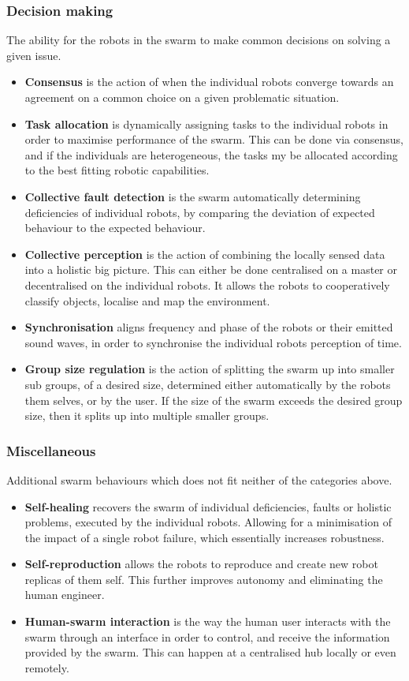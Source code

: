 \subsubsection{Decision making}
The ability for the robots in the swarm to make common decisions on solving a given issue.
\begin{itemize}
    \item \textbf{Consensus} is the action of when the individual robots converge towards an agreement on a common choice on a given problematic situation.
    \item \textbf{Task allocation} is dynamically assigning tasks to the individual robots in order to maximise performance of the swarm. This can be done via consensus, and if the individuals are heterogeneous, the tasks my be allocated according to the best fitting robotic capabilities. 
    \item \textbf{Collective fault detection} is the swarm automatically determining deficiencies of individual robots, by comparing the deviation of expected behaviour to the expected behaviour. 
    \item \textbf{Collective perception} is the action of combining the locally sensed data into a holistic big picture. This can either be done centralised on a master or decentralised on the individual robots. It allows the robots to cooperatively classify objects, localise and map the environment. 
    \item \textbf{Synchronisation} aligns frequency and phase of the robots or their emitted sound waves, in order to synchronise the individual robots perception of time. 
    \item \textbf{Group size regulation} is the action of splitting the swarm up into smaller sub groups, of a desired size, determined either automatically by the robots them selves, or by the user. If the size of the swarm exceeds the desired group size, then it splits up into multiple smaller groups.
\end{itemize}

\subsubsection{Miscellaneous}
Additional swarm behaviours which does not fit neither of the categories above. 
\begin{itemize}
    \item \textbf{Self-healing} recovers the swarm of individual deficiencies, faults or holistic problems, executed by the individual robots. Allowing for a minimisation of the impact of a single robot failure, which essentially increases robustness. 
    \item \textbf{Self-reproduction} allows the robots to reproduce and create new robot replicas of them self. This further improves autonomy and eliminating the human engineer. 
    \item \textbf{Human-swarm interaction} is the way the human user interacts with the swarm through an interface in order to control, and receive the information provided by the swarm. This can happen at a centralised hub locally or even remotely.
\end{itemize}

